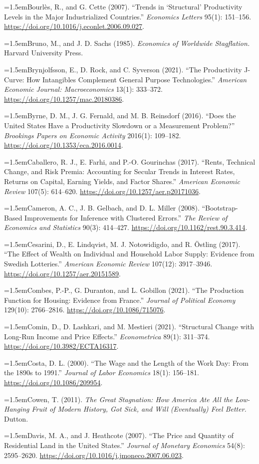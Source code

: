 \documentclass[12pt]{article}
\theoremstyle{plain}
\newcommand{\refentry}[1]{\par\hangindent=1.5em\hangafter=1\noindent #1}
\begin{document}
{\refentry{Bourl\`es, R., and G. Cette (2007). ``Trends in `Structural' Productivity Levels in the Major Industrialized Countries.'' \emph{Economics Letters} 95(1): 151--156. \url{https://doi.org/10.1016/j.econlet.2006.09.027}.}
\refentry{Bruno, M., and J. D. Sachs (1985). \emph{Economics of Worldwide Stagflation.} Harvard University Press.}
\refentry{Brynjolfsson, E., D. Rock, and C. Syverson (2021). ``The Productivity J-Curve: How Intangibles Complement General Purpose Technologies.'' \emph{American Economic Journal: Macroeconomics} 13(1): 333--372. \url{https://doi.org/10.1257/mac.20180386}.}
\refentry{Byrne, D. M., J. G. Fernald, and M. B. Reinsdorf (2016). ``Does the United States Have a Productivity Slowdown or a Measurement Problem?'' \emph{Brookings Papers on Economic Activity} 2016(1): 109--182. \url{https://doi.org/10.1353/eca.2016.0014}.}
\refentry{Caballero, R. J., E. Farhi, and P.-O. Gourinchas (2017). ``Rents, Technical Change, and Risk Premia: Accounting for Secular Trends in Interest Rates, Returns on Capital, Earning Yields, and Factor Shares.'' \emph{American Economic Review} 107(5): 614--620. \url{https://doi.org/10.1257/aer.p20171036}.}
\refentry{Cameron, A. C., J. B. Gelbach, and D. L. Miller (2008). ``Bootstrap-Based Improvements for Inference with Clustered Errors.'' \emph{The Review of Economics and Statistics} 90(3): 414--427. \url{https://doi.org/10.1162/rest.90.3.414}.}
\refentry{Cesarini, D., E. Lindqvist, M. J. Notowidigdo, and R. \"Ostling (2017). ``The Effect of Wealth on Individual and Household Labor Supply: Evidence from Swedish Lotteries.'' \emph{American Economic Review} 107(12): 3917--3946. \url{https://doi.org/10.1257/aer.20151589}.}
\refentry{Combes, P.-P., G. Duranton, and L. Gobillon (2021). ``The Production Function for Housing: Evidence from France.'' \emph{Journal of Political Economy} 129(10): 2766--2816. \url{https://doi.org/10.1086/715076}.}
\refentry{Comin, D., D. Lashkari, and M. Mestieri (2021). ``Structural Change with Long-Run Income and Price Effects.'' \emph{Econometrica} 89(1): 311--374. \url{https://doi.org/10.3982/ECTA16317}.}
\refentry{Costa, D. L. (2000). ``The Wage and the Length of the Work Day: From the 1890s to 1991.'' \emph{Journal of Labor Economics} 18(1): 156--181. \url{https://doi.org/10.1086/209954}.}
\refentry{Cowen, T. (2011). \emph{The Great Stagnation: How America Ate All the Low-Hanging Fruit of Modern History, Got Sick, and Will (Eventually) Feel Better.} Dutton.}
\refentry{Davis, M. A., and J. Heathcote (2007). ``The Price and Quantity of Residential Land in the United States.'' \emph{Journal of Monetary Economics} 54(8): 2595--2620. \url{https://doi.org/10.1016/j.jmoneco.2007.06.023}.}
}
\end{document}
